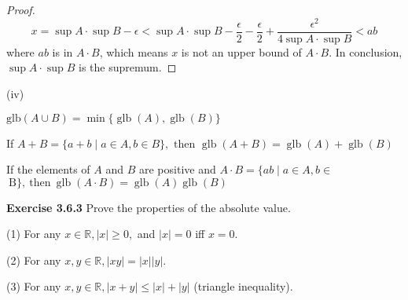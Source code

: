 \documentclass[12pt]{article}
\theoremstyle{definition}
\numberwithin{equation}{subsection}
\begin{document}
\begin{proof}
$$x = \sup A \cdot \sup B - \epsilon < \sup A \cdot \sup B - \frac{\epsilon}{2} - \frac{\epsilon}{2} + \frac{\epsilon^2}{4\sup A \cdot \sup B} < ab$$ where $ab$ is in $A \cdot B$, which means $x$ is not an upper bound of $A \cdot B$. In conclusion, $\sup A \cdot \sup B$ is the supremum.

\end{proof}

(iv)

    $\text{glb} (A \cup B)=\min \{\operatorname{glb}(A), \operatorname{glb}(B)\} $

    If $A+B=\{a+b \mid a \in A, b \in B\}, \text { then } \operatorname{glb}(A+B)=\operatorname{glb}(A)+ \operatorname{glb}(B) $

    If the elements of $A$ and $B$ are positive and $A \cdot B=\{a b \mid a \in A, b \in$
    $\mathrm{~ B \} , ~ t h e n ~} \operatorname{glb}(A \cdot B)=\operatorname{glb}(A) \operatorname{glb}(B)$

\bigskip


\textbf{Exercise 3.6.3} Prove the properties of the absolute value.

(1) For any $x \in \mathbb{R},|x| \geq 0,$ and $|x|=0$ iff $x=0$.

(2) For any $x, y \in \mathbb{R},|x y|=|x||y|$.

(3) For any $x, y \in \mathbb{R},|x+y| \leq|x|+|y|$ (triangle inequality).
\end{document}
